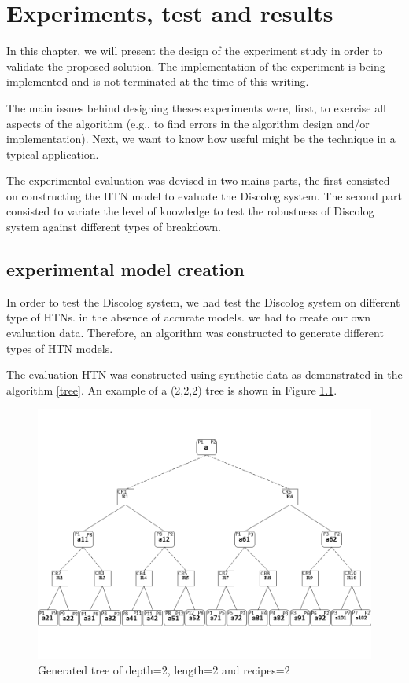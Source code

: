 \chapter{Experiments, test and results} %

\label{Chapter 6} %


In this chapter, we will present the design of the experiment study in order to validate the proposed solution. The implementation of the experiment is being implemented and is not terminated at the time of this writing.

The main issues behind designing theses experiments were, first, to exercise all aspects of the algorithm (e.g., to find errors in the algorithm design and/or implementation). Next, we want to know how useful might be the technique in a typical application. 


The experimental evaluation was devised in two mains parts, the first consisted on constructing the HTN model to evaluate the Discolog system. The second part consisted to variate the level of knowledge to test the robustness of  Discolog system against different types of breakdown. 


\section{experimental model creation}
In order to test the Discolog system, we had test the Discolog system on different type of HTNs. in the absence of accurate models. we had to create our own evaluation data. Therefore, an algorithm was constructed to generate different types of HTN models. 

The evaluation HTN was constructed using synthetic data as demonstrated in the algorithm \ref{tree}. An example of a (2,2,2) tree is shown in Figure \ref{tree figure}.

\begin{figure}[h]
	\centering
	\includegraphics[width=\textwidth]{Pictures/treeg.png}
	\caption{\label{tree figure} Generated tree of depth=2, length=2 and recipes=2}
\end{figure}

